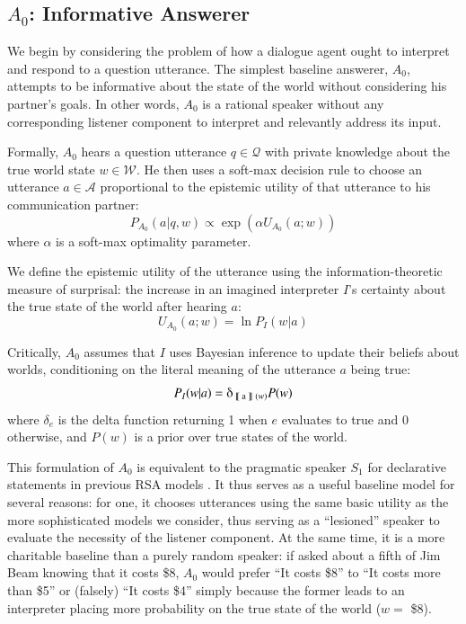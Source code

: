 \documentclass[12pt, floatsintext, jou]{apa6}
\newcommand{\den}[2][]{
\(
\left\llbracket\;\text{#2}\;\right\rrbracket^{#1}
\)
}
\newcommand{\ndg}[1]{\textcolor{Green}{[ndg: #1]}}
\begin{document}

\subsection{$A_0$: Informative Answerer}

We begin by considering the problem of how a dialogue agent ought to interpret and respond to a question utterance. The simplest baseline answerer, $A_0$, attempts to be informative about the state of the world without considering his partner's goals. In other words, $A_0$ is a rational speaker without any corresponding listener component to interpret and relevantly address its input. 

Formally, $A_0$ hears a question utterance $q \in \mathcal{Q}$ with private knowledge about the true world state $w \in \mathcal{W}$. He then uses a soft-max decision rule to choose an utterance $a \in \mathcal{A}$ proportional to the epistemic utility of that utterance to his communication partner: 
$$P_{A_0}(a | q, w) \propto \exp(\alpha U_{A_0}(a;w))$$ 
where $\alpha$ is a soft-max optimality parameter. 

We define the epistemic utility of the utterance using the information-theoretic measure of surprisal: the increase in an imagined interpreter $I$'s certainty about the true state of the world after hearing $a$: 
\begin{equation}
\label{eq:A0utility}
U_{A_0}(a;w) = \ln P_I(w|a)
\end{equation}

Critically, $A_0$ assumes that $I$ uses Bayesian inference to update their beliefs about worlds, conditioning on the literal meaning of the utterance $a$ being true:
$$P_I(w|a) = \delta_{\textrm{\den{a}}(w)} P(w)$$
where $\delta_{e}$ is the delta function returning 1 when $e$ evaluates to true and 0 otherwise, and $P(w)$ is a prior over true states of the world. 

This formulation of $A_0$ is equivalent to the pragmatic speaker $S_1$ for declarative statements in previous RSA models \cite{GoodmanFrank16_RSATiCS}. It thus serves as a useful baseline model for several reasons: for one, it chooses utterances using the same basic utility as the more sophisticated models we consider, thus serving as a ``lesioned'' speaker to evaluate the necessity of the listener component. At the same time, it is a more charitable baseline than a purely random speaker: if asked about a fifth of Jim Beam knowing that it costs \$8, $A_0$ would prefer ``It costs \$8'' to ``It costs more than \$5'' or (falsely) ``It costs \$4'' simply because the former leads to an interpreter placing more probability on the true state of the world ($w = $ \$8).
\end{document}
